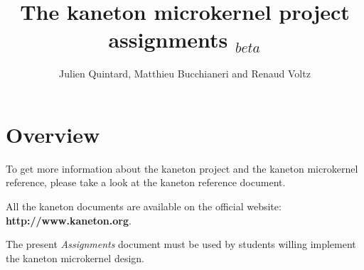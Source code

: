 
%
%



%
%


%
%

\title{The kaneton microkernel project assignments $_{beta}$
       \logos}

%
%

\author{\small{Julien Quintard},
        \small{Matthieu Bucchianeri} and
        \small{Renaud Voltz}}

%
%



%
%

\maketitle

\newpage

\tableofcontents

\newpage

%
%

%
%

\section{Overview}

To get more information about the kaneton project and the kaneton
microkernel reference, please take a look at the kaneton reference
document.

All the kaneton documents are available on the official website:
\textbf{http://www.kaneton.org}.

The present \textit{Assignments} document must be used by students
willing implement the kaneton microkernel design.

%
%
%

%


